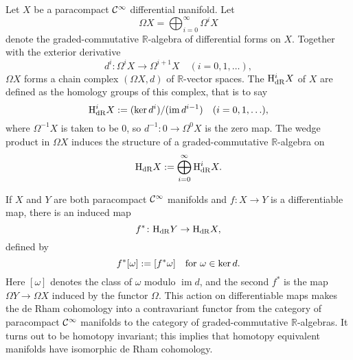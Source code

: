 \documentclass[12pt]{article}
\newcommand{\HdR}{{\rm H}_{\rm dR}}
\newcommand{\im}{\mathop{\mathrm{im}}}
\begin{document}
Let $X$ be a paracompact ${\cal C}^\infty$ differential manifold.  Let
$$
\Omega X=\bigoplus_{i=0}^\infty\Omega^i X
$$
denote the graded-commutative $\mathbb{R}$-algebra of differential forms on $X$.  Together with the exterior derivative
$$
d^i\colon\Omega^i X\to\Omega^{i+1}X\quad(i=0,1,\ldots),
$$
$\Omega X$ forms a chain complex $(\Omega X,d)$ of $\mathbb{R}$-vector spaces.  The  ${\rm H}_{\rm dR}^i X$ of $X$ are defined as the homology groups of this complex, that is to say
$$
{\rm H}_{\rm dR}^i X:=(\ker d^i)/(\im d^{i-1})\quad(i=0,1,\ldots),
$$
where $\Omega^{-1}X$ is taken to be 0, so $d^{-1}\colon 0\to\Omega^0 X$ is the zero map.  The wedge product in $\Omega X$ induces the structure of a graded-commutative $\mathbb{R}$-algebra on
$$
{\rm H}_{\rm dR}X:=\bigoplus_{i=0}^{\infty}\HdR^i X.
$$

If $X$ and $Y$ are both paracompact ${\cal C}^\infty$ manifolds and $f\colon X\to Y$ is a differentiable map, there is an induced map
$$
f^*\colon \HdR Y\to\HdR X,
$$
defined by
$$
f^*[\omega]:=[f^*\omega]\quad\hbox{for $\omega\in\ker d$}.
$$
Here $[\omega]$ denotes the class of $\omega$ modulo $\im d$, and the second $f^*$ is the map $\Omega Y\to\Omega X$ induced by the functor $\Omega$.  This action on differentiable maps makes the de Rham cohomology into a contravariant functor from the category of paracompact ${\cal C}^\infty$ manifolds to the category of graded-commutative $\mathbb{R}$-algebras.  It turns out to be homotopy invariant; this implies that homotopy equivalent manifolds have isomorphic de Rham cohomology.
\end{document}
